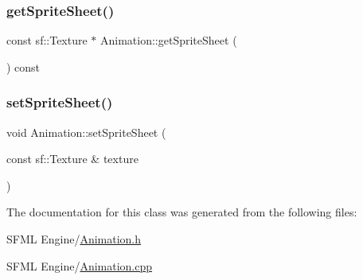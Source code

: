 \mbox{\label{class_animation_abf4f00f8b1657829583d7d92e71b93d1}} 
\subsubsection{\texorpdfstring{get\+Sprite\+Sheet()}{getSpriteSheet()}}
{\footnotesize\ttfamily const sf\+::\+Texture $\ast$ Animation\+::get\+Sprite\+Sheet (\begin{DoxyParamCaption}{ }\end{DoxyParamCaption}) const}

\mbox{\label{class_animation_a2fb16f452a323d51a0104c0aa454cab3}} 
\subsubsection{\texorpdfstring{set\+Sprite\+Sheet()}{setSpriteSheet()}}
{\footnotesize\ttfamily void Animation\+::set\+Sprite\+Sheet (\begin{DoxyParamCaption}\item[{const sf\+::\+Texture \&}]{texture }\end{DoxyParamCaption})}



The documentation for this class was generated from the following files\+:\begin{DoxyCompactItemize}
\item 
S\+F\+M\+L Engine/\hyperlink{_animation_8h}{Animation.\+h}\item 
S\+F\+M\+L Engine/\hyperlink{_animation_8cpp}{Animation.\+cpp}\end{DoxyCompactItemize}
